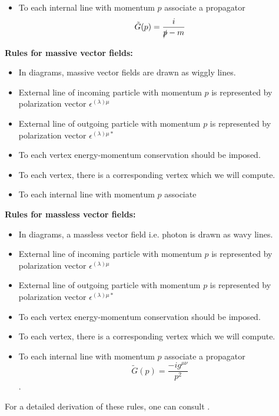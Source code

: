 \documentclass[12pt]{report}
\begin{document}
\begin{appendices}
\begin{itemize}
\item To each internal line with momentum $p$ associate a propagator $$\tilde{G}(p)= \frac{i}{\slashed{p}-m}$$
\end{itemize}


\textbf{Rules for massive vector fields:}

\begin{itemize}
\item In diagrams, massive vector fields are drawn as wiggly lines.
\item External line of incoming particle with momentum $p$ is represented by polarization vector $\epsilon^{(\lambda) \mu}$
\item External line of outgoing particle with momentum $p$ is represented by polarization vector $\epsilon^{(\lambda) \mu *}$
\item To each vertex energy-momentum conservation should be imposed.
\item To each vertex, there is a corresponding vertex which we will compute.
\item To each internal line with momentum $p$ associate %
\end{itemize}


\textbf{Rules for massless vector fields:}

\begin{itemize}
\item In diagrams, a massless vector field i.e. photon is drawn as wavy lines.
\item External line of incoming particle with momentum $p$ is represented by polarization vector $\epsilon^{(\lambda) \mu}$
\item External line of outgoing particle with momentum $p$ is represented by polarization vector $\epsilon^{(\lambda) \mu *}$
\item To each vertex energy-momentum conservation should be imposed.
\item To each vertex, there is a corresponding vertex which we will compute.
\item To each internal line with momentum $p$ associate a propagator $$\tilde{G}(p) = \frac{-ig^{\mu \nu}}{p^2}$$.
\end{itemize}

For a detailed derivation of these rules, one can consult \cite{pes}.

\end{appendices}
\end{document}
